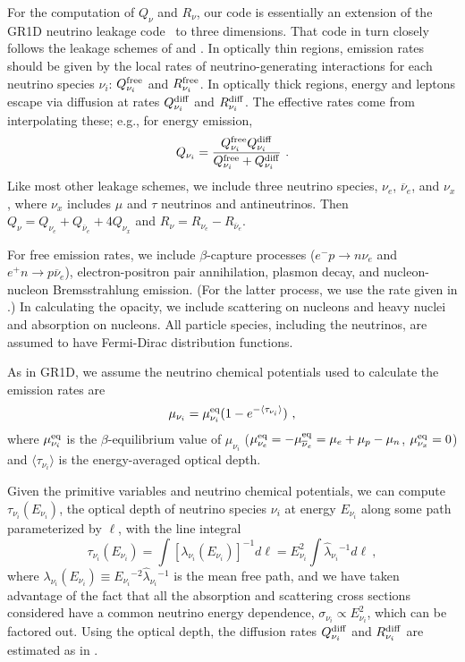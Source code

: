For the computation of $Q_{\nu}$ and $R_{\nu}$, our code is
essentially an extension of the GR1D neutrino leakage
code~\citep{OConnor2010} to three dimensions.  That code in turn closely
follows the leakage schemes of \cite{Ruffert1996} and
\cite{Rosswog:2003rv}.  In optically thin regions,
emission rates should be given by the local rates of
neutrino-generating interactions for each neutrino species
$\nu_i$:  $Q_{\nu_i}^{\rm free}$ and $R_{\nu_i}^{\rm free}$.  In
optically thick regions, energy and leptons escape via diffusion
at rates $Q_{\nu_i}^{\rm diff}$ and $R_{\nu_i}^{\rm diff}$.  The effective
rates come from interpolating these; e.g., for energy emission,
\begin{equation}
  Q_{\nu_i} =
  \frac{Q_{\nu_i}^{\rm free}Q_{\nu_i}^{\rm diff}}
       {Q_{\nu_i}^{\rm free}+ Q_{\nu_i}^{\rm diff}}\ .
\end{equation}
Like most other leakage schemes, we include three neutrino species,
$\nu_e$, $\overline{\nu}_e$, and $\nu_x$, where $\nu_x$ includes
$\mu$ and $\tau$ neutrinos and antineutrinos.  Then
$Q_{\nu}=Q_{\nu_e} + Q_{\overline{\nu}_e} + 4 Q_{\nu_x}$ and
$R_{\nu}=R_{\nu_e}-R_{\overline{\nu}_e}$.

For free emission rates, we include $\beta$-capture processes
($e^{-}p \rightarrow n\nu_{e}$ and $e^{+}n \rightarrow p\overline{\nu}_{e}$),
electron-positron pair annihilation, plasmon decay, and
nucleon-nucleon Bremsstrahlung emission.  (For the latter process,
we use the rate given in \citealt{Burrows2006b}.)  In calculating the opacity,
we include scattering on nucleons and heavy nuclei and absorption
on nucleons.  All particle species, including the neutrinos, are
assumed to have Fermi-Dirac distribution functions.

As in GR1D, we assume the neutrino chemical potentials
used to calculate the emission rates are
\begin{equation}
\label{mu_nu}
\mu_{\nu_i} = \mu_{\nu_i}^{\rm eq}(1-e^{-\langle\tau_{\nu_i}\rangle})\ ,
\end{equation}
where $\mu_{\nu_i}^{\rm eq}$ is the $\beta$-equilibrium value of
$\mu_{\nu_i}$ ($\mu^{\rm eq}_{\nu_e}=-\mu^{\rm eq}_{\overline{\nu}_e}
=\mu_e+\mu_p-\mu_n$, $\mu^{\rm eq}_{\nu_x}=0$) and $\langle\tau_{\nu_i}\rangle$ is
the energy-averaged optical depth.

Given the primitive variables
and neutrino chemical potentials, we can compute $\tau_{\nu_i}(E_{\nu_i})$, the
optical depth of neutrino species $\nu_i$ at energy $E_{\nu_i}$
along some path parameterized by $\ell$, with the line integral
\begin{equation}
\label{tau_integral}
\tau_{\nu_i}(E_{\nu_i}) = \int [\lambda_{\nu_i}(E_{\nu_i})]^{-1} d\ell
 = E_{\nu_i}^2 \int \hat{\lambda}_{\nu_i}{}^{-1} d\ell\ ,
\end{equation}
where $\lambda_{\nu_i}(E_{\nu_i})\equiv E_{\nu_i}{}^{-2}\hat{\lambda}_{\nu_i}{}^{-1}$
is the mean free path, and we have taken advantage of the fact that all
the absorption and scattering cross sections considered have a common neutrino
energy dependence, $\sigma_{\nu_i}\propto E_{\nu_i}^2$, which can be factored out.
Using the optical depth, the diffusion rates
$Q_{\nu_i}^{\rm diff}$ and $R_{\nu_i}^{\rm diff}$ are estimated as in
\cite{Rosswog:2003rv}.

